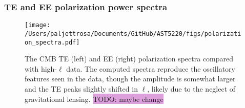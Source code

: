 \documentclass{aa}
\numberwithin{equation}{section}
\numberwithin{table}{section}
\numberwithin{figure}{section}
\begin{document}


\subsubsection{TE and EE polarization power spectra}

\begin{figure*}
  \centering
  \texttt{[image: /Users/paljettrosa/Documents/GitHub/AST5220/figs/polarization\_spectra.pdf]}
  \caption{The CMB TE (left) and EE (right) polarization spectra compared with high-$\ell$ data. The computed spectra reproduce the oscillatory features seen in the data, though the amplitude is somewhat larger and the TE peaks slightly shifted in $\ell$, likely due to the neglect of gravitational lensing. \colorbox{Plum}{TODO: maybe change}}\label{fig:polarization spectra}
\end{figure*}



\end{document}

